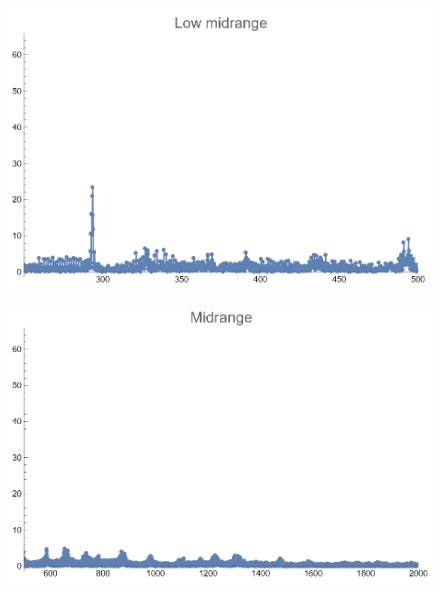 \documentclass[12pt, letterpaper]{article}
\begin{document}
\begin{figure}[H]
  \centering
  \begin{minipage}{.5\textwidth}
    \centering
    \includegraphics[width=.9\linewidth]{imgs/Cancion2/lowmid.png}
    \label{fig:02d}
  \end{minipage}%
  \begin{minipage}{.5\textwidth}
    \centering
    \includegraphics[width=.9\linewidth]{imgs/Cancion2/mid.png}
    \label{fig:02e}
  \end{minipage}
\end{figure}
\end{document}
